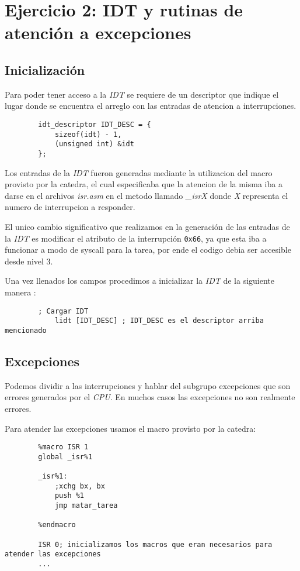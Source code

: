 \section{Ejercicio 2: IDT y rutinas de atención a excepciones}

	\subsection{Inicialización}

	Para poder tener acceso a la \textit{IDT} se requiere de un descriptor que indique el lugar donde se encuentra el arreglo con las entradas de atencion a interrupciones. 

	\begin{lstlisting}
		idt_descriptor IDT_DESC = {
	    	sizeof(idt) - 1,
	    	(unsigned int) &idt
		};
	\end{lstlisting}

	Los entradas de la \textit{IDT} fueron generadas mediante la utilizacion del macro provisto por la catedra, el cual especificaba que la atencion de la misma iba a darse en el archivos \textit{isr.asm} en el metodo llamado \textit{\_isrX} donde \textit{X} representa el numero de interrupcion a responder. 

	El unico cambio significativo que realizamos en la generación de las entradas de la \textit{IDT} es modificar el atributo de la interrupción \texttt{0x66}, ya que esta iba a funcionar a modo de syscall para la tarea, por ende el codigo debia ser accesible desde nivel 3. 

	Una vez llenados los campos procedimos a inicializar la \textit{IDT} de la siguiente manera :

	\begin{lstlisting}
   		; Cargar IDT
    		lidt [IDT_DESC] ; IDT_DESC es el descriptor arriba mencionado
	\end{lstlisting}

	\subsection{Excepciones}

	Podemos dividir a las interrupciones y hablar del subgrupo excepciones que son errores generados por el \textit{CPU}. En muchos casos las excepciones no son realmente errores.

	Para atender las excepciones usamos el macro provisto por la catedra:

	\begin{lstlisting}
   		%macro ISR 1
		global _isr%1

		_isr%1:
		    ;xchg bx, bx
		    push %1
		    jmp matar_tarea

		%endmacro

		ISR 0; inicializamos los macros que eran necesarios para atender las excepciones
		...
	\end{lstlisting}

